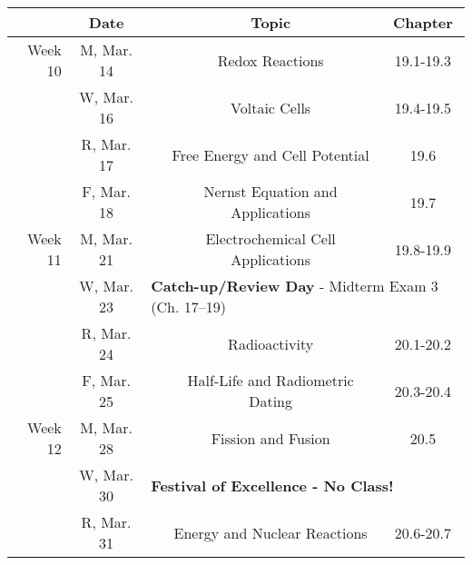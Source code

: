 \documentclass[12pt, letterpaper]{article}
\begin{document}
\begin{tabular}{rcccc}
	            & Date       &                                                                                                 & Topic                                 & Chapter   \\
	\midrule
	Week 10     & M, Mar. 14 &                                                                                                 & Redox Reactions                       & 19.1-19.3 \\
	            & W, Mar. 16 &                                                                                                 & Voltaic Cells                         & 19.4-19.5 \\
	            & R, Mar. 17 &                                                                                                 & Free Energy and Cell Potential        & 19.6      \\
	            & F, Mar. 18 &                                                                                                 & Nernst Equation and Applications      & 19.7      \\
	\midrule
	Week 11     & M, Mar. 21 &                                                                                                 & Electrochemical Cell Applications     & 19.8-19.9 \\
	            & W, Mar. 23 & \multicolumn{3}{l}{\textbf{Catch-up/Review Day} - Midterm Exam 3 (Ch. 17--19)}                                                                      \\
	            & R, Mar. 24 &                                                                                                 & Radioactivity                         & 20.1-20.2 \\
	            & F, Mar. 25 &                                                                                                 & Half-Life and Radiometric Dating      & 20.3-20.4 \\
	\midrule
	Week 12     & M, Mar. 28 &                                                                                                 & Fission and Fusion                    & 20.5      \\
	            & W, Mar. 30 & \multicolumn{3}{l}{\textbf{Festival of Excellence - No Class!}}                                                                                     \\
	            & R, Mar. 31 &                                                                                                 & Energy and Nuclear Reactions          & 20.6-20.7 \\

\end{tabular}
\end{document}
